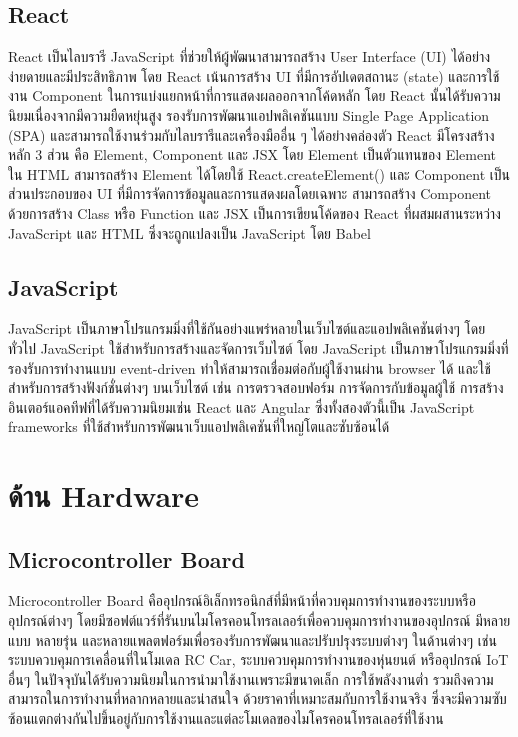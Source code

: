 \subsection{React}
    React เป็นไลบรารี JavaScript ที่ช่วยให้ผู้พัฒนาสามารถสร้าง User Interface (UI) ได้อย่างง่ายดายและมีประสิทธิภาพ โดย React เน้นการสร้าง UI ที่มีการอัปเดตสถานะ (state) 
และการใช้งาน Component ในการแบ่งแยกหน้าที่การแสดงผลออกจากโค้ดหลัก โดย React นั้นได้รับความนิยมเนื่องจากมีความยืดหยุ่นสูง รองรับการพัฒนาแอปพลิเคชันแบบ Single Page Application (SPA) 
และสามารถใช้งานร่วมกับไลบรารีและเครื่องมืออื่น ๆ ได้อย่างคล่องตัว
    React มีโครงสร้างหลัก 3 ส่วน คือ Element, Component และ JSX โดย Element เป็นตัวแทนของ Element ใน HTML สามารถสร้าง Element ได้โดยใช้ React.createElement() 
และ Component เป็นส่วนประกอบของ UI ที่มีการจัดการข้อมูลและการแสดงผลโดยเฉพาะ สามารถสร้าง Component ด้วยการสร้าง Class หรือ Function และ JSX เป็นการเขียนโค้ดของ React 
ที่ผสมผสานระหว่าง JavaScript และ HTML ซึ่งจะถูกแปลงเป็น JavaScript โดย Babel\cite{React}

\subsection{JavaScript}
JavaScript เป็นภาษาโปรแกรมมิ่งที่ใช้กันอย่างแพร่หลายในเว็บไซต์และแอปพลิเคชันต่างๆ โดยทั่วไป JavaScript ใช้สำหรับการสร้างและจัดการเว็บไซต์ โดย JavaScript 
เป็นภาษาโปรแกรมมิ่งที่รองรับการทำงานแบบ event-driven ทำให้สามารถเชื่อมต่อกับผู้ใช้งานผ่าน browser ได้ และใช้สำหรับการสร้างฟังก์ชั่นต่างๆ บนเว็บไซต์ เช่น การตรวจสอบฟอร์ม 
การจัดการกับข้อมูลผู้ใช้ การสร้างอินเตอร์แอคทีฟที่ได้รับความนิยมเช่น React และ Angular ซึ่งทั้งสองตัวนี้เป็น JavaScript frameworks ที่ใช้สำหรับการพัฒนาเว็บแอปพลิเคชันที่ใหญ่โตและซับซ้อนได้\cite{JavaScript}

\section{ด้าน Hardware}

\subsection{Microcontroller Board}
Microcontroller Board คืออุปกรณ์อิเล็กทรอนิกส์ที่มีหน้าที่ควบคุมการทำงานของระบบหรืออุปกรณ์ต่างๆ โดยมีซอฟต์แวร์ที่รันบนไมโครคอนโทรลเลอร์เพื่อควบคุมการทำงานของอุปกรณ์ มีหลายแบบ หลายรุ่น และหลายแพลตฟอร์มเพื่อรองรับการพัฒนาและปรับปรุงระบบต่างๆ ในด้านต่างๆ เช่น ระบบควบคุมการเคลื่อนที่ในโมเดล RC Car, 
ระบบควบคุมการทำงานของหุ่นยนต์ หรืออุปกรณ์ IoT อื่นๆ ในปัจจุบันได้รับความนิยมในการนำมาใช้งานเพราะมีขนาดเล็ก การใช้พลังงานต่ำ รวมถึงความสามารถในการทำงานที่หลากหลายและน่าสนใจ ด้วยราคาที่เหมาะสมกับการใช้งานจริง ซึ่งจะมีความซับซ้อนแตกต่างกันไปขึ้นอยู่กับการใช้งานและแต่ละโมเดลของไมโครคอนโทรลเลอร์ที่ใช้งาน\cite{Micro}

